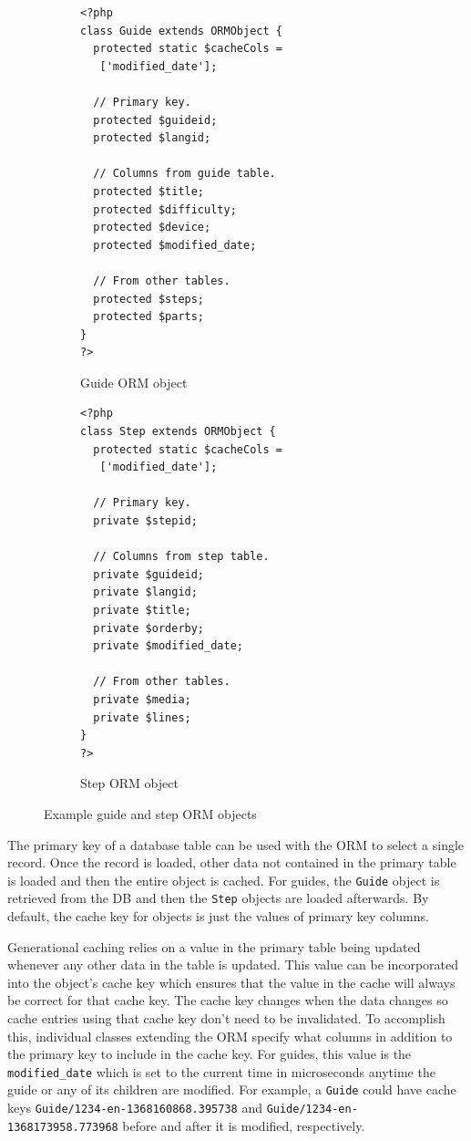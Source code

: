 \documentclass[12pt]{ucthesis}
\begin{document}
\begin{figure}[h]
\begin{subfigure}[h]{0.5\textwidth}
\begin{ssp}
\begin{verbatim}
<?php
class Guide extends ORMObject {
  protected static $cacheCols =
   ['modified_date'];

  // Primary key.
  protected $guideid;
  protected $langid;

  // Columns from guide table.
  protected $title;
  protected $difficulty;
  protected $device;
  protected $modified_date;

  // From other tables.
  protected $steps;
  protected $parts;
}
?>
\end{verbatim}
\caption{Guide ORM object}
\label{fig:guideORMTable}
\end{ssp}
\end{subfigure}
\begin{subfigure}[h]{0.5\textwidth}
\begin{ssp}
\begin{verbatim}
<?php
class Step extends ORMObject {
  protected static $cacheCols =
   ['modified_date'];

  // Primary key.
  private $stepid;

  // Columns from step table.
  private $guideid;
  private $langid;
  private $title;
  private $orderby;
  private $modified_date;

  // From other tables.
  private $media;
  private $lines;
}
?>
\end{verbatim}
\caption{Step ORM object}
\label{fig:stepORMObject}
\end{ssp}
\end{subfigure}
\caption{Example guide and step ORM objects}
\label{fig:cachingExample}
\end{figure}

The primary key of a database table can be used with the ORM to select a single record.
Once the record is loaded, other data not contained in the primary table is loaded and then the entire object is cached.
For guides, the {\tt Guide} object is retrieved from the DB and then the {\tt Step} objects are loaded afterwards.
By default, the cache key for objects is just the values of primary key columns.

Generational caching relies on a value in the primary table being updated whenever any other data in the table is updated.
This value can be incorporated into the object's cache key which ensures that the value in the cache will always be correct for that cache key.
The cache key changes when the data changes so cache entries using that cache key don't need to be invalidated.
To accomplish this, individual classes extending the ORM specify what columns in addition to the primary key to include in the cache key.
For guides, this value is the {\tt modified\_date} which is set to the current time in microseconds anytime the guide or any of its children are modified.
For example, a {\tt Guide} could have cache keys {\tt Guide/1234-en-1368160868.395738} and {\tt Guide/1234-en-1368173958.773968} before and after it is modified, respectively.
\end{document}
